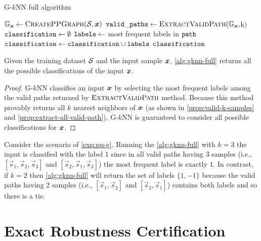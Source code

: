 \begin{algorithm}[H]
	\caption[G-$k$NN full algorithm]{G-$k$NN full algorithm}
	\label{alg:gknn-full}
	\begin{algorithmic}[1]

    \State $\mathbb{G}_{\bm{x}} \gets \textsc{CreatePPGraph}(\mathcal{S}, \bm{x})$
    \State $\mathtt{valid\_paths} \gets \textsc{ExtractValidPath}(\mathbb{G}_{\bm{x}}, $k$)$
    \State $\mathtt{classification} \gets \emptyset$
      \State $\mathtt{labels} \gets $ most frequent labels in $\mathtt{path}$
      \State $\mathtt{classification} \gets \mathtt{classification} \cup \mathtt{labels}$
    \EndFor
    \State \Return $\mathtt{classification}$
	\end{algorithmic}
\end{algorithm}

\begin{theorem}
Given the training dataset $\mathcal{S}$ and the input sample $\bm{x}$, \autoref{alg:gknn-full} returns all the possible classifications of the input $\bm{x}$.
\end{theorem}
\begin{proof}
G-$k$NN classifies an input $\bm{x}$ by selecting the most frequent labels among the valid paths returned by $\textsc{ExtractValidPath}$ method. Because this method provably returns all $k$ nearest neighbors of $\bm{x}$ (as shown in \autoref{prop:valid-k-samples} and \autoref{prop:extract-all-valid-path}), G-$k$NN is guaranteed to consider all possible classifications for $\bm{x}$.
\end{proof}

\begin{example}
  Consider the scenario of \autoref{exp:pp-g}. Running the \autoref{alg:gknn-full} with $k=3$ the input is classified with the label $1$ since in all valid paths having $3$ samples (i.e., $[\vec{s}_1, \vec{s}_2, \vec{s}_3]$ and $[\vec{s}_2, \vec{s}_1, \vec{s}_3]$) the most frequent label is exactly $1$. In contrast, if $k=2$ then \autoref{alg:gknn-full} will return the set of labels $\{1, -1\}$ because the valid paths having $2$ samples (i.e., $[\vec{s}_1, \vec{s}_2]$ and $[\vec{s}_2, \vec{s}_1]$) contains both labels and so there is a tie.
\end{example}

\section{Exact Robustness Certification}
\label{sec:exact-certifier}

